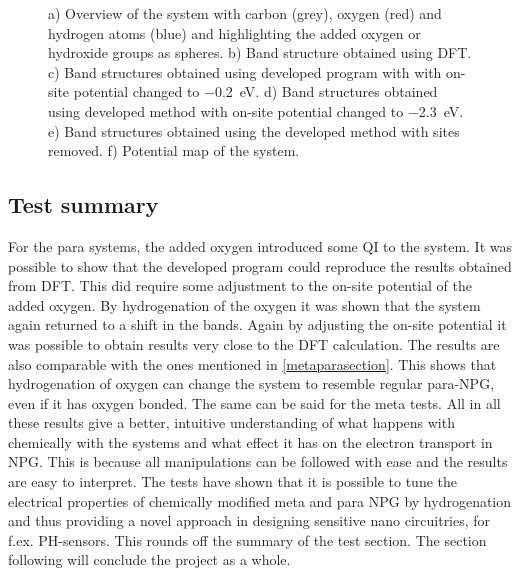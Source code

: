 \begin{figure}[H]
\begin{subfigure}[b]{0.8\textwidth}
		\vspace{-0.5\baselineskip}
		\caption{}
		\label{potmapMS2OH}
	\end{subfigure}
	\caption{a) Overview of the system with carbon (grey), oxygen (red) and hydrogen atoms (blue) and highlighting the added oxygen or hydroxide groups as spheres. b) Band structure obtained using DFT. c) Band structures obtained using developed program with with on-site potential changed to \SI{-0.2}{\electronvolt}. d) Band structures obtained using developed method with on-site potential changed to \SI{-2.3}{\electronvolt}. e) Band structures obtained using the developed method with sites removed. f) Potential map of the system.}
	\label{MS2OH}
\end{figure}
\subsection{Test summary}
For the para systems, the added oxygen introduced some QI to the system. It was possible to show that the developed program could reproduce the results obtained from DFT. This did require some adjustment to the on-site potential of the added oxygen. By hydrogenation of the oxygen it was shown that the system again returned to a shift in the bands. Again by adjusting the on-site potential it was possible to obtain results very close to the DFT calculation. The results are also comparable with the ones mentioned in \cref{metaparasection}. This shows that hydrogenation of oxygen can change the system to resemble regular para-NPG, even if it has oxygen bonded. The same can be said for the meta tests. All in all these results give a better, intuitive understanding of what happens with chemically with the systems and what effect it has on the electron transport in NPG. This is because all manipulations can be followed with ease and the results are easy to interpret. The tests have shown that it is possible to tune the electrical properties of chemically modified meta and para NPG by hydrogenation and thus providing a novel approach in designing sensitive nano circuitries, for f.ex. PH-sensors. This rounds off the summary of the test section. The section following will conclude the project as a whole.
